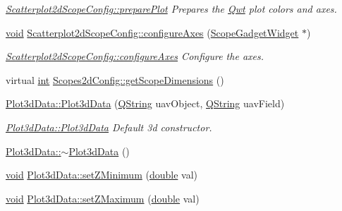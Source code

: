 \begin{DoxyCompactItemize}
\begin{DoxyCompactList}\small\item\em \hyperlink{group___scope_plugin_ga7ff8815549e33c472a7ada6080401b38}{Scatterplot2d\-Scope\-Config\-::prepare\-Plot} Prepares the \hyperlink{namespace_qwt}{Qwt} plot colors and axes. \end{DoxyCompactList}\item 
\hyperlink{group___u_a_v_objects_plugin_ga444cf2ff3f0ecbe028adce838d373f5c}{void} \hyperlink{group___scope_plugin_ga420168b2c6740e98666d76cf58bfb2ee}{Scatterplot2d\-Scope\-Config\-::configure\-Axes} (\hyperlink{class_scope_gadget_widget}{Scope\-Gadget\-Widget} $\ast$)
\begin{DoxyCompactList}\small\item\em \hyperlink{group___scope_plugin_ga420168b2c6740e98666d76cf58bfb2ee}{Scatterplot2d\-Scope\-Config\-::configure\-Axes} Configure the axes. \end{DoxyCompactList}\item 
virtual \hyperlink{ioapi_8h_a787fa3cf048117ba7123753c1e74fcd6}{int} \hyperlink{group___scope_plugin_ga95a6bd24b6f73fad855102d785678676}{Scopes2d\-Config\-::get\-Scope\-Dimensions} ()
\item 
\hyperlink{group___scope_plugin_ga1f2325d51b8163d0c535e07fda3ff043}{Plot3d\-Data\-::\-Plot3d\-Data} (\hyperlink{group___u_a_v_objects_plugin_gab9d252f49c333c94a72f97ce3105a32d}{Q\-String} uav\-Object, \hyperlink{group___u_a_v_objects_plugin_gab9d252f49c333c94a72f97ce3105a32d}{Q\-String} uav\-Field)
\begin{DoxyCompactList}\small\item\em \hyperlink{group___scope_plugin_ga1f2325d51b8163d0c535e07fda3ff043}{Plot3d\-Data\-::\-Plot3d\-Data} Default 3d constructor. \end{DoxyCompactList}\item 
\hyperlink{group___scope_plugin_gaba0a6fcc762d6818f231df0e8a975089}{Plot3d\-Data\-::$\sim$\-Plot3d\-Data} ()
\item 
\hyperlink{group___u_a_v_objects_plugin_ga444cf2ff3f0ecbe028adce838d373f5c}{void} \hyperlink{group___scope_plugin_gaa8457325b9ed2d7199e882002d9cb64f}{Plot3d\-Data\-::set\-Z\-Minimum} (\hyperlink{_super_l_u_support_8h_a8956b2b9f49bf918deed98379d159ca7}{double} val)
\item 
\hyperlink{group___u_a_v_objects_plugin_ga444cf2ff3f0ecbe028adce838d373f5c}{void} \hyperlink{group___scope_plugin_gad2d6739b5faacba8f73c88fbc9b6592d}{Plot3d\-Data\-::set\-Z\-Maximum} (\hyperlink{_super_l_u_support_8h_a8956b2b9f49bf918deed98379d159ca7}{double} val)

\end{DoxyCompactItemize}
